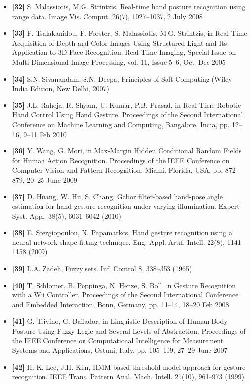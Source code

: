 \documentclass[12pt, a4paper]{article}
\begin{document}
\begin{itemize}[label=]
    \item \textbf{[32]} S. Malassiotis, M.G. Strintzis, Real-time hand posture recognition using range data. Image Vis. Comput. 26(7), 1027–1037, 2 July 2008
    \item \textbf{[33]} F. Tsalakanidou, F. Forster, S. Malassiotis, M.G. Strintzis, in Real-Time Acquisition of Depth and Color Images Using Structured Light and Its Application to 3D Face Recognition. Real-Time Imaging, Special Issue on Multi-Dimensional Image Processing, vol. 11, Issue 5–6, Oct–Dec 2005
    \item \textbf{[34]} S.N. Sivanandam, S.N. Deepa, Principles of Soft Computing (Wiley India Edition, New Delhi, 2007)
    \item \textbf{[35]} J.L. Raheja, R. Shyam, U. Kumar, P.B. Prasad, in Real-Time Robotic Hand Control Using Hand Gesture. Proceedings of the Second International Conference on Machine Learning and Computing, Bangalore, India, pp. 12–16, 9–11 Feb 2010
    \item \textbf{[36]} Y. Wang, G. Mori, in Max-Margin Hidden Conditional Random Fields for Human Action Recognition. Proceedings of the IEEE Conference on Computer Vision and Pattern Recognition, Miami, Florida, USA, pp. 872–879, 20–25 June 2009
    \item \textbf{[37]} D. Huang, W. Hu, S. Chang, Gabor filter-based hand-pose angle estimation for hand gesture recognition under varying illumination. Expert Syst. Appl. 38(5), 6031–6042 (2010)
    \item \textbf{[38]} E. Stergiopoulou, N. Papamarkos, Hand gesture recognition using a neural network shape fitting technique. Eng. Appl. Artif. Intell. 22(8), 1141–1158 (2009)
    \item \textbf{[39]} L.A. Zadeh, Fuzzy sets. Inf. Control 8, 338–353 (1965)
    \item \textbf{[40]} T. Schlomer, B. Poppinga, N. Henze, S. Boll, in Gesture Recognition with a Wii Controller. Proceedings of the Second International Conference and Embedded Interaction, Bonn, Germany, pp. 11–14, 18–20 Feb 2008
    \item \textbf{[41]} G. Trivino, G. Bailador, in Linguistic Description of Human Body Posture Using Fuzzy Logic and Several Levels of Abstraction. Proceedings of the IEEE Conference on Computational Intelligence for Measurement Systems and Applications, Ostuni, Italy, pp. 105–109, 27–29 June 2007
    \item \textbf{[42]} H.-K. Lee, J.H. Kim, HMM based threshold model approach for gesture recognition. IEEE Trans. Pattern Anal. Mach. Intell. 21(10), 961–973 (1999)

\end{itemize}
\end{document}
